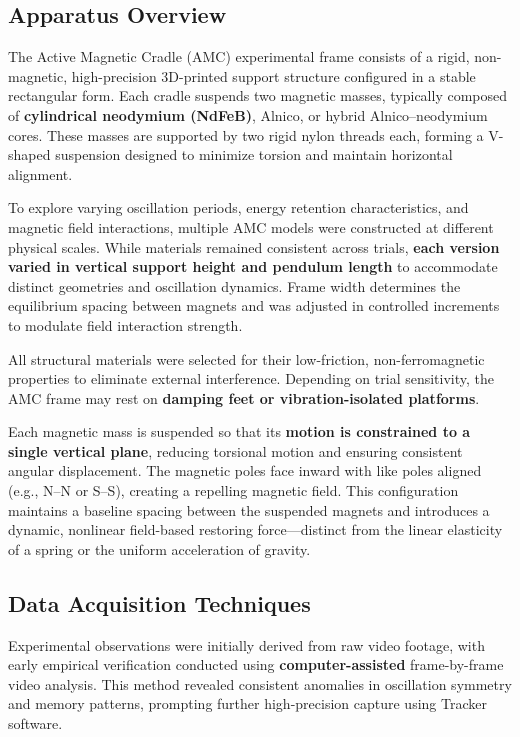 \documentclass[10pt,aps,pre,onecolumn,superscriptaddress,notitlepage]{revtex4-2}
\begin{document}
\subsection{Apparatus Overview}

The Active Magnetic Cradle (AMC) experimental frame consists of a rigid, non-magnetic, high-precision 3D-printed support structure configured in a stable rectangular form. Each cradle suspends two magnetic masses, typically composed of \textbf{cylindrical neodymium (NdFeB)}, Alnico, or hybrid Alnico--neodymium cores. These masses are supported by two rigid nylon threads each, forming a V-shaped suspension designed to minimize torsion and maintain horizontal alignment.

To explore varying oscillation periods, energy retention characteristics, and magnetic field interactions, multiple AMC models were constructed at different physical scales. While materials remained consistent across trials, \textbf{each version varied in vertical support height and pendulum length} to accommodate distinct geometries and oscillation dynamics. Frame width determines the equilibrium spacing between magnets and was adjusted in controlled increments to modulate field interaction strength.

All structural materials were selected for their low-friction, non-ferromagnetic properties to eliminate external interference. Depending on trial sensitivity, the AMC frame may rest on \textbf{damping feet or vibration-isolated platforms}.

Each magnetic mass is suspended so that its \textbf{motion is constrained to a single vertical plane}, reducing torsional motion and ensuring consistent angular displacement. The magnetic poles face inward with like poles aligned (e.g., N--N or S--S), creating a repelling magnetic field. This configuration maintains a baseline spacing between the suspended magnets and introduces a dynamic, nonlinear field-based restoring force---distinct from the linear elasticity of a spring or the uniform acceleration of gravity.

\subsection{Data Acquisition Techniques}

Experimental observations were initially derived from raw video footage, with early empirical verification conducted using \textbf{computer-assisted} frame-by-frame video analysis. This method revealed consistent anomalies in oscillation symmetry and memory patterns, prompting further high-precision capture using Tracker software.
\end{document}
